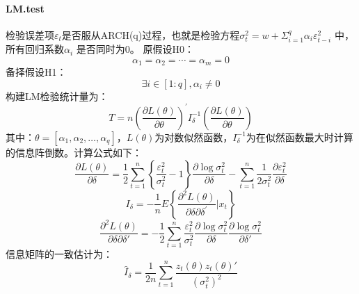             \paragraph{LM.test}
            检验误差项$\varepsilon_t$是否服从ARCH(q)过程，也就是检验方程$\sigma_t^2=w+\Sigma_{i=1}^q{\alpha_i \varepsilon_{t-i}^2 }$ 中，所有回归系数$\alpha_i$ 是否同时为0。
            原假设H0：
            \[{\alpha _1} = {\alpha _2} = \cdots = {\alpha _m} = 0\]
            备择假设H1：
            \[\exists i \in [1:q],{\alpha _i} \ne 0\]
            构建LM检验统计量为：
            \[T = n\left(\frac{\partial L\left( \theta  \right)}{\partial \theta } \right)^{'}{I_\delta ^{-1}}{\left(\frac{\partial L\left( \theta  \right)}{\partial \theta } \right)}\]
            其中：$\theta=[\alpha_1,\alpha_2,…,\alpha_q]，L(\theta)$为对数似然函数，$I_\delta^{-1}$为在似然函数最大时计算的信息阵倒数。计算公式如下：
            \[\frac{{\partial L\left( \theta  \right)}}{{\partial \delta }} = \frac{1}{2}\sum\limits_{t = 1}^n {\left\{ {\frac{{\varepsilon _t^2}}{{\sigma _t^2}} - 1} \right\}} \frac{{\partial \log \sigma _t^2}}{{\partial \delta }} - \sum\limits_{t = 1}^n {\frac{1}{{2\sigma _t^2}}} \frac{{\partial \varepsilon _t^2}}{{\partial \delta }}\]
            \begin{equation*}
            I_\delta  =  {{- \frac1n}E\left\{ {\frac{\partial ^2L\left( \theta  \right)}{\partial \delta \partial \delta ^{'}}}{\bigg|x_t} \right\} }
            \end{equation*}
            \begin{equation*}
            {\frac{\partial ^2L\left( \theta  \right)}{\partial \delta \partial \delta {'}}} = { - \frac12{\sum\limits_{t = 1}^n } {\frac{\varepsilon _t^2}{\sigma _t^2}}} {\frac{\partial \log \sigma _t^2}{\partial \delta }}{\frac{\partial \log \sigma _t^2}{\partial \delta '}}
            \end{equation*}
            信息矩阵的一致估计为：
            \begin{equation*}
            {\hat I_\delta } ={ \frac{1}{2n}\sum\limits_{t = 1}^n }{\frac{z_t\left( \theta  \right)z_t\left( \theta  \right)'}{{\left( \sigma _t^2 \right)}^2}}
            \end{equation*}
